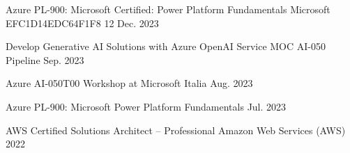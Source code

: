 

\begin{cvhonors}

  \cvhonor
    {Azure PL-900: Microsoft Certified: Power Platform Fundamentals} %
    {Microsoft} %
    {EFC1D14EDC64F1F8} %
    {12 Dec. 2023} %

  \cvhonor
    {Develop Generative AI Solutions with Azure OpenAI Service MOC AI-050} %
    {Pipeline} %
    {} %
    {Sep. 2023} %

  \cvhonor
    {Azure AI-050T00} %
    {Workshop at Microsoft Italia} %
    {} %
    {Aug. 2023} %

  \cvhonor
    {Azure PL-900: Microsoft Power Platform Fundamentals} %
    {} %
    {} %
    {Jul. 2023} %

  \cvhonor
    {AWS Certified Solutions Architect – Professional} %
    {Amazon Web Services (AWS)} %
    {} %
    {2022} %


\end{cvhonors}
